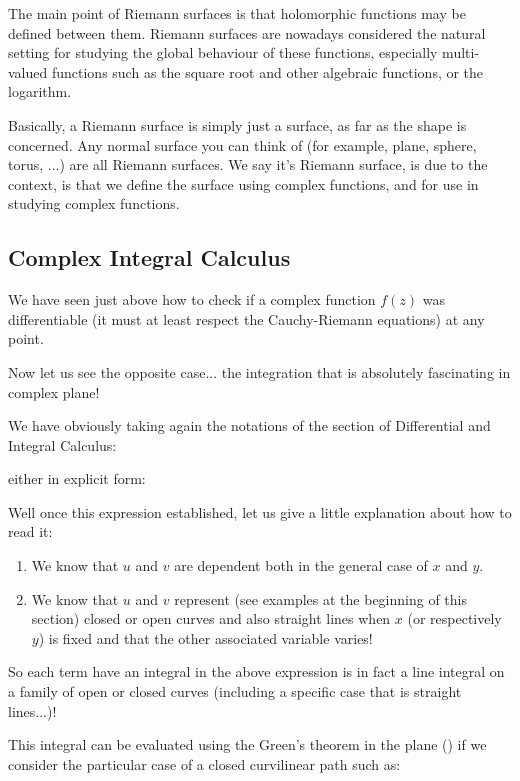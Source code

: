 	The main point of Riemann surfaces is that holomorphic functions may be defined between them. Riemann surfaces are nowadays considered the natural setting for studying the global behaviour of these functions, especially multi-valued functions such as the square root and other algebraic functions, or the logarithm.
	
	Basically, a Riemann surface is simply just a surface, as far as the shape is concerned. Any normal surface you can think of (for example, plane, sphere, torus, ...) are all Riemann surfaces. We say it's Riemann surface, is due to the context, is that we define the surface using complex functions, and for use in studying complex functions.
	
	\subsection{Complex Integral Calculus}
	We have seen just above how to check if a complex function $f (z)$ was differentiable (it must at least respect the Cauchy-Riemann equations) at any point.
	
	Now let us see the opposite case... the integration that is absolutely fascinating in complex plane!
	
	We have obviously taking again the notations of the section of Differential and Integral Calculus:
	
	either in explicit form:
	
	Well once this expression established, let us give a little explanation about how to read it:
	\begin{enumerate}
		\item We know that $u$ and $v$ are dependent both in the general case of $x$ and $y$.
		
		\item We know that $ u $ and $ v $ represent (see examples at the beginning of this section) closed or open curves and also straight lines when $ x $ (or respectively $y$) is fixed and that the other associated variable varies!
	\end{enumerate}
	So each term have an integral in the above expression is in fact a line integral on a family of open or closed curves (including a specific case that is straight lines...)!
	
	This integral can be evaluated using the Green's theorem in the plane () if we consider the particular case of a closed curvilinear path such as:
	
